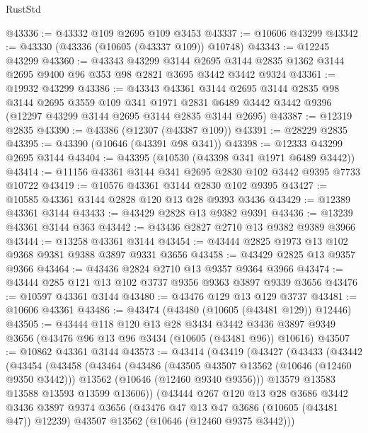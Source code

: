 \begin{lexlean}{RustStd}
\begin{coremodule}
@43336 := @43332 @109 @2695 @109 @3453
@43337 := @10606 @43299
@43342 := @43330 (@43336 (@10605 (@43337 @109)) @10748)
@43343 := @12245 @43299
@43360 := @43343
    @43299
    @3144
    @2695
    @3144
    @2835
    @1362
    @3144
    @2695
    @9400
    @96
    @353
    @98
    @2821
    @3695
    @3442
    @3442
    @9324
@43361 := @19932 @43299
@43386 := @43343
    @43361
    @3144
    @2695
    @3144
    @2835
    @98
    @3144
    @2695
    @3559
    @109
    @341
    @1971
    @2831
    @6489
    @3442
    @3442
    @9396
    (@12297 @43299 @3144 @2695 @3144 @2835 @3144 @2695)
@43387 := @12319 @2835
@43390 := @43386 (@12307 (@43387 @109))
@43391 := @28229 @2835
@43395 := @43390 (@10646 (@43391 @98 @341))
@43398 := @12333 @43299 @2695 @3144
@43404 := @43395 (@10530 (@43398 @341 @1971 @6489 @3442))
@43414 := @11156 @43361 @3144 @341 @2695 @2830 @102 @3442 @9395 @7733 @10722
@43419 := @10576 @43361 @3144 @2830 @102 @9395
@43427 := @10585 @43361 @3144 @2828 @120 @13 @28 @9393 @3436
@43429 := @12389 @43361 @3144
@43433 := @43429 @2828 @13 @9382 @9391
@43436 := @13239 @43361 @3144 @363
@43442 := @43436 @2827 @2710 @13 @9382 @9389 @3966
@43444 := @13258 @43361 @3144
@43454 := @43444 @2825 @1973 @13 @102 @9368 @9381 @9388 @3897 @9331 @3656
@43458 := @43429 @2825 @13 @9357 @9366
@43464 := @43436 @2824 @2710 @13 @9357 @9364 @3966
@43474 := @43444 @285 @121 @13 @102 @3737 @9356 @9363 @3897 @9339 @3656
@43476 := @10597 @43361 @3144
@43480 := @43476 @129 @13 @129 @3737
@43481 := @10606 @43361
@43486 := @43474 (@43480 (@10605 (@43481 @129)) @12446)
@43505 := @43444
    @118
    @120
    @13
    @28
    @3434
    @3442
    @3436
    @3897
    @9349
    @3656
    (@43476 @96 @13 @96 @3434 (@10605 (@43481 @96)) @10616)
@43507 := @10862 @43361 @3144
@43573 := @43414
    (@43419
      (@43427
        (@43433
          (@43442
            (@43454
              (@43458
                (@43464
                  (@43486
                    (@43505 @43507 @13562 (@10646 (@12460 @9350 @3442)))
                    @13562
                    (@10646 (@12460 @9340 @9356)))
                  @13579
                  @13583
                  @13588
                  @13593
                  @13599
                  @13606))
              (@43444
                @267
                @120
                @13
                @28
                @3686
                @3442
                @3436
                @3897
                @9374
                @3656
                (@43476 @47 @13 @47 @3686 (@10605 (@43481 @47)) @12239)
                @43507
                @13562
                (@10646 (@12460 @9375 @3442)))

\end{coremodule}
\end{lexlean}
